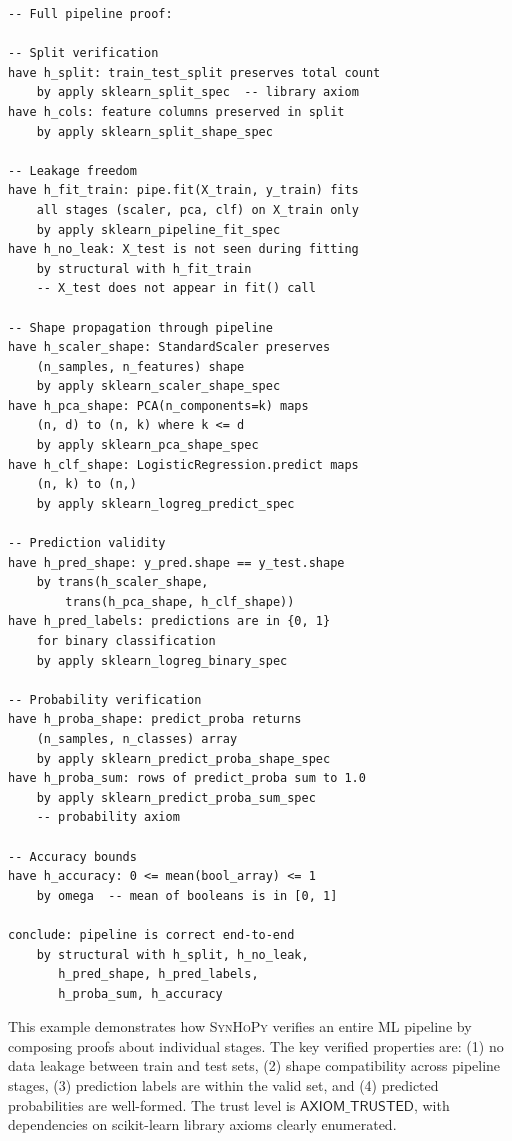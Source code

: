 \documentclass[11pt,a4paper]{report}
\theoremstyle{definition}
\theoremstyle{plain}
\newcommand{\synhopy}{\textsc{SynHoPy}}
\begin{document}
\begin{lstlisting}[style=proof]
-- Full pipeline proof:

-- Split verification
have h_split: train_test_split preserves total count
    by apply sklearn_split_spec  -- library axiom
have h_cols: feature columns preserved in split
    by apply sklearn_split_shape_spec

-- Leakage freedom
have h_fit_train: pipe.fit(X_train, y_train) fits
    all stages (scaler, pca, clf) on X_train only
    by apply sklearn_pipeline_fit_spec
have h_no_leak: X_test is not seen during fitting
    by structural with h_fit_train
    -- X_test does not appear in fit() call

-- Shape propagation through pipeline
have h_scaler_shape: StandardScaler preserves
    (n_samples, n_features) shape
    by apply sklearn_scaler_shape_spec
have h_pca_shape: PCA(n_components=k) maps
    (n, d) to (n, k) where k <= d
    by apply sklearn_pca_shape_spec
have h_clf_shape: LogisticRegression.predict maps
    (n, k) to (n,)
    by apply sklearn_logreg_predict_spec

-- Prediction validity
have h_pred_shape: y_pred.shape == y_test.shape
    by trans(h_scaler_shape,
        trans(h_pca_shape, h_clf_shape))
have h_pred_labels: predictions are in {0, 1}
    for binary classification
    by apply sklearn_logreg_binary_spec

-- Probability verification
have h_proba_shape: predict_proba returns
    (n_samples, n_classes) array
    by apply sklearn_predict_proba_shape_spec
have h_proba_sum: rows of predict_proba sum to 1.0
    by apply sklearn_predict_proba_sum_spec
    -- probability axiom

-- Accuracy bounds
have h_accuracy: 0 <= mean(bool_array) <= 1
    by omega  -- mean of booleans is in [0, 1]

conclude: pipeline is correct end-to-end
    by structural with h_split, h_no_leak,
       h_pred_shape, h_pred_labels,
       h_proba_sum, h_accuracy
\end{lstlisting}

This example demonstrates how \synhopy{} verifies an entire ML pipeline
by composing proofs about individual stages.  The key verified properties
are: (1) no data leakage between train and test sets, (2) shape
compatibility across pipeline stages, (3) prediction labels are within the
valid set, and (4) predicted probabilities are well-formed.  The trust
level is $\mathsf{AXIOM\_TRUSTED}$, with dependencies on scikit-learn
library axioms clearly enumerated.
\end{document}

